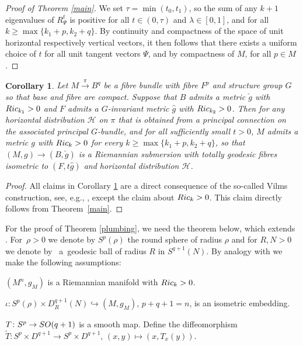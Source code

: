 \documentclass[11pt]{article}
\numberwithin{equation}{section}
\numberwithin{equation}{section}
\newtheorem{Corollary}[Theorem]{Corollary}
\renewenvironment{enumerate}[1][]{\list{\textnormal{(\arabic{enumi})}}{\usecounter{enumi}}}{\endlist}
\begin{document}
\begin{proof}[Proof of Theorem \ref{main}]
	We set $\tau=\min(t_0,t_1)$, so the sum of any $k+1$ eigenvalues of $R_\Psi^t$ is positive for all $t\in(0,\tau)$ and $\lambda\in[0,1]$, and for all $k\geq \max\{k_1+p,k_2+q\}$. By continuity and compactness of the space of unit horizontal respectively vertical vectors, it then follows that there exists a uniform choice of $t$ for all unit tangent vectors $\Psi$, and by compactness of $M$, for all $p\in M$.
\end{proof}


\begin{Corollary}\label{fibre_bundles1}
	Let $M\xrightarrow{\pi}B^q$ be a fibre bundle with fibre $F^p$ and structure group $G$ so that base and fibre are compact. Suppose that $B$ admits a metric $\check{g}$ with ${\rm Ric}_{k_1}>0$ and $F$ admits a $G$-invariant metric $\hat{g}$ with ${\rm Ric}_{k_2}>0$. Then for any horizontal distribution $\mathcal{H}$ on $\pi$ that is obtained from a principal connection on the associated principal $G$-bundle, and for all sufficiently small $t>0$, $M$ admits a metric $g$ with ${\rm Ric}_k>0$ for every $k\ge \max\{k_1+p,k_2+q\}$, so that $(M,g)\to (B,\check{g})$ is a Riemannian submersion with totally geodesic fibres isometric to $(F,t\hat{g})$ and horizontal distribution $\mathcal{H}$.
\end{Corollary}

\begin{proof}
	All claims in Corollary \ref{fibre_bundles1} are a direct consequence of the so-called Vilms construction, see, e.g., \cite[Theorem~9.59]{Be}, except the claim about ${\rm Ric}_k>0$. This claim directly follows from Theorem~\ref{main}.
\end{proof}

For the proof of Theorem \ref{plumbing}, we need the theorem below, which extends \cite[Theorem~C]{RW}. For~${\rho>0}$ we denote by $S^p(\rho)$ the round sphere of radius $\rho$ and for $R,N>0$ we denote by~ a~geodesic ball of radius $R$ in $S^{q+1}(N)$. By analogy with \cite{Wr2} we make the following assumptions:
\begin{enumerate}[label=\textnormal{(\arabic*)}]\itemsep=0pt
	\item $(M^n,g_M)$ is a Riemannian manifold with ${\rm Ric}_k>0$.
	\item $\iota\colon S^p(\rho)\times D_R^{q+1}(N)\hookrightarrow (M,g_M)$, $p+q+1=n$, is an isometric embedding.
	\item $T\colon S^p\to {\rm SO}(q+1)$ is a smooth map. Define the diffeomorphism $\tilde{T}\colon S^p\times D^{q+1}\to S^p\times D^{q+1},\, (x,y)\mapsto (x,T_x(y))$.
\end{enumerate}
\end{document}
